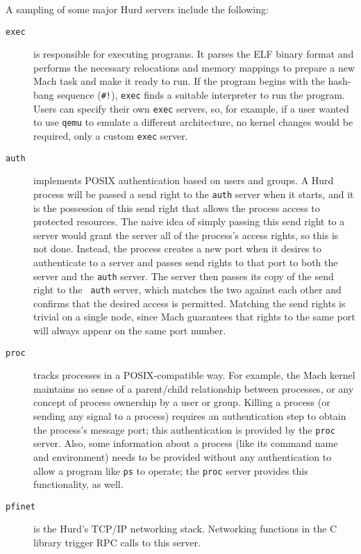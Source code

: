 \documentclass{article}
\begin{document}
A sampling of some major Hurd servers include the following:

\begin{description}
\item[{\tt exec}]

is responsible for executing programs.  It
parses the ELF binary format and performs the necessary relocations
and memory mappings to prepare a new Mach task and make it ready to
run.  If the program begins with the hash-bang sequence ({\tt \#!}),
{\tt exec} finds a suitable interpreter to run the program.  Users can
specify their own {\tt exec} servers, so, for example, if a user
wanted to use {\tt qemu} to emulate a different architecture, no
kernel changes would be required, only a custom {\tt exec} server.

\item[{\tt auth}]

implements POSIX authentication based on users and groups.  A Hurd
process will be passed a send right to the {\tt auth} server when it
starts, and it is the possession of this send right that allows the
process access to protected resources.  The naive idea of simply
passing this send right to a server would grant the server all of the
process's access rights, so this is not done.  Instead, the process
creates a new port when it desires to authenticate to a server and
passes send rights to that port to both the server and the {\tt auth}
server.  The server then passes its copy of the send right to the {\tt
  auth} server, which matches the two against each other and confirms
that the desired access is permitted.  Matching the send rights is
trivial on a single node, since Mach guarantees that rights to the
same port will always appear on the same port number.

\item[{\tt proc}]

tracks processes in a POSIX-compatible way.  For
example, the Mach kernel maintains no sense of a parent/child
relationship between processes, or any concept of process ownership by
a user or group.  Killing a process (or sending any signal to a
process) requires an authentication step to obtain the process's
message port; this authentication is provided by the {\tt proc}
server.  Also, some information about a process (like its command name
and environment) needs to be provided without any authentication to
allow a program like {\tt ps} to operate; the {\tt proc} server
provides this functionality, as well.

\item[{\tt pfinet}]

is the Hurd's TCP/IP networking stack.  Networking functions in
the C library trigger RPC calls to this server.

\end{description}
\end{document}
